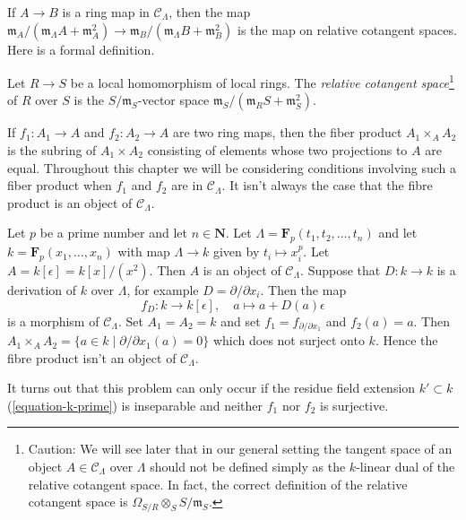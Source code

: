 \noindent
If $A \to B$ is a ring map in $\mathcal{C}_\Lambda$, then the map
$\mathfrak m_A/(\mathfrak m_\Lambda A + \mathfrak m_A^2)
\to \mathfrak m_B/(\mathfrak m_\Lambda B + \mathfrak m_B^2)$
is the map on relative cotangent spaces. Here is a formal definition.

\begin{definition}
\label{definition-tangent-space-ring}
Let $R \to S$ be a local homomorphism of local rings. The
{\it relative cotangent space}\footnote{Caution: We will see later
that in our general setting the tangent
space of an object $A \in \mathcal{C}_\Lambda$ over $\Lambda$ should
not be defined simply as the $k$-linear dual of the relative
cotangent space. In fact, the correct definition of the relative
cotangent space is
$\Omega_{S/R} \otimes_S S/\mathfrak m_S$.} of $R$ over $S$ is the
$S/\mathfrak m_S$-vector space
$\mathfrak m_S/(\mathfrak m_R S + \mathfrak m_S^2)$.
\end{definition}

\noindent
If $f_1: A_1 \to A$ and $f_2: A_2 \to A$ are two ring maps, then the fiber
product $A_1 \times_A A_2$ is the subring of $A_1 \times A_2$ consisting of
elements whose two projections to $A$ are equal. Throughout this chapter we
will be considering conditions involving such a fiber product when $f_1$
and $f_2$ are in $\mathcal{C}_\Lambda$. It isn't always the case that the
fibre product is an object of $\mathcal{C}_\Lambda$.

\begin{example}
\label{example-fibre-product}
Let $p$ be a prime number and let $n \in \mathbf{N}$.
Let $\Lambda = \mathbf{F}_p(t_1, t_2, \ldots, t_n)$ and let
$k = \mathbf{F}_p(x_1, \ldots, x_n)$ with map $\Lambda \to k$ given
by $t_i \mapsto x_i^p$. Let $A = k[\epsilon] = k[x]/(x^2)$.
Then $A$ is an object of $\mathcal{C}_\Lambda$. Suppose that
$D : k \to k$ is a derivation of $k$ over $\Lambda$, for example
$D = \partial/\partial x_i$. Then the map
$$
f_D : k \longrightarrow k[\epsilon],\quad
a \mapsto a + D(a)\epsilon
$$
is a morphism of $\mathcal{C}_\Lambda$. Set $A_1 = A_2 = k$ and set
$f_1 = f_{\partial/\partial x_1}$ and $f_2(a) = a$. Then
$A_1 \times_A A_2 = \{a \in k \mid \partial/\partial x_1(a) = 0\}$
which does not surject onto $k$. Hence the fibre product isn't
an object of $\mathcal{C}_\Lambda$.
\end{example}

\noindent
It turns out that this problem can only occur if the residue field
extension $k' \subset k$ (\ref{equation-k-prime}) is inseparable
and neither $f_1$ nor $f_2$ is surjective.

